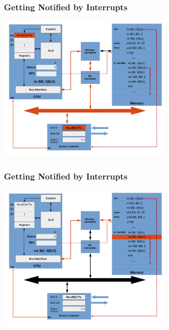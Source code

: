 \documentclass{beamer}
\begin{document}
\begin{frame}[fragile]
\frametitle{Getting Notified by Interrupts}

\begin{center}
\vspace*{-0.23cm}
\hspace*{-1cm}\includegraphics[width=8.7cm]{interrupt_waiting16.pdf}
\end{center}

\end{frame}

\begin{frame}[fragile]
\frametitle{Getting Notified by Interrupts}

\begin{center}
\vspace*{-0.23cm}
\hspace*{-1cm}\includegraphics[width=8.7cm]{interrupt_waiting17.pdf}
\end{center}

\end{frame}
\end{document}
